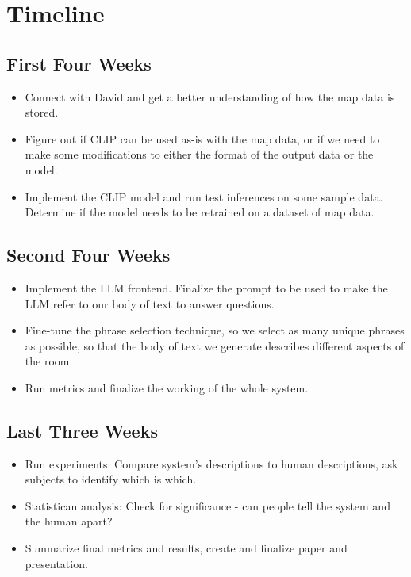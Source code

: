 \documentclass[letterpaper, 10 pt, conference]{ieeeconf}  %
\begin{document}
\section{Timeline}
    \subsection*{First Four Weeks}
    \begin{itemize}
        \item Connect with David and get a better understanding of how the map data is stored.
        \item Figure out if CLIP can be used as-is with the map data, or if we need to make some modifications to either the format of the output data or the model.
        \item Implement the CLIP model and run test inferences on some sample data. Determine if the model needs to be retrained on a dataset of map data.
    \end{itemize}

    \subsection*{Second Four Weeks}
    \begin{itemize}
        \item Implement the LLM frontend. Finalize the prompt to be used to make the LLM refer to our body of text to answer questions.
        \item Fine-tune the phrase selection technique, so we select as many unique phrases as possible, so that the body of text we generate describes different aspects of the room.
        \item Run metrics and finalize the working of the whole system.
    \end{itemize}

    \subsection*{Last Three Weeks}
    \begin{itemize}
        \item Run experiments: Compare system's descriptions to human descriptions, ask subjects to identify which is which.
        \item Statistican analysis: Check for significance - can people tell the system and the human apart?
        \item Summarize final metrics and results, create and finalize paper and presentation.
    \end{itemize}

%
%
\end{document}
